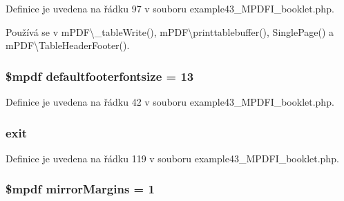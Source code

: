 Definice je uvedena na řádku 97 v souboru example43\-\_\-\-M\-P\-D\-F\-I\-\_\-booklet.\-php.



Používá se v m\-P\-D\-F\textbackslash{}\-\_\-table\-Write(), m\-P\-D\-F\textbackslash{}printtablebuffer(), Single\-Page() a m\-P\-D\-F\textbackslash{}\-Table\-Header\-Footer().

\hypertarget{example43___m_p_d_f_i__booklet_8php_af908f917e35d865734d31eecf6841116}{
\subsubsection[{defaultfooterfontsize}]{\setlength{\rightskip}{0pt plus 5cm}\$mpdf defaultfooterfontsize = 13}}\label{example43___m_p_d_f_i__booklet_8php_af908f917e35d865734d31eecf6841116}


Definice je uvedena na řádku 42 v souboru example43\-\_\-\-M\-P\-D\-F\-I\-\_\-booklet.\-php.

\hypertarget{example43___m_p_d_f_i__booklet_8php_a6733eb5f605d09eaede9845835d71c4e}{
\subsubsection[{exit}]{\setlength{\rightskip}{0pt plus 5cm}exit}}\label{example43___m_p_d_f_i__booklet_8php_a6733eb5f605d09eaede9845835d71c4e}


Definice je uvedena na řádku 119 v souboru example43\-\_\-\-M\-P\-D\-F\-I\-\_\-booklet.\-php.

\hypertarget{example43___m_p_d_f_i__booklet_8php_a24c284cb7774410f65953584ea1fd9c1}{
\subsubsection[{mirror\-Margins}]{\setlength{\rightskip}{0pt plus 5cm}\$mpdf mirror\-Margins = 1}}\label{example43___m_p_d_f_i__booklet_8php_a24c284cb7774410f65953584ea1fd9c1}


